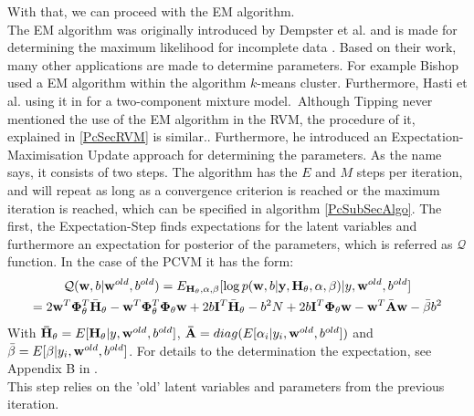 With that, we can proceed with the \acs{EM} algorithm.\cite{Chen.2009}\\
The \acs{EM} algorithm was originally introduced by Dempster et al. and is made for determining the maximum likelihood for incomplete data \cite{Dempster.1977}. 
Based on their work, many other applications are made to determine parameters.
For example Bishop used a \acs{EM} algorithm within the algorithm $k$-means cluster.\cite[p. 426-428]{Bishop.2009}
Furthermore, Hasti et al. using it in \cite[p. 272-276]{TrevorHastie.2009} for a two-component mixture model.\
Although Tipping never mentioned the use of the \acs{EM} algorithm in the \acs{RVM}, the procedure of it, explained in \ref{PcSecRVM} is similar.\cite[p. 233-234]{Tipping.2001}.
Furthermore, he introduced an Expectation-Maximisation Update approach for determining the parameters.\cite[. 235]{Tipping.2001} \newline
As the name says, it consists of two steps.
The algorithm has the $E$ and $M$ steps per iteration, and will repeat as long as a convergence criterion is reached or the maximum iteration is reached, which can be specified in algorithm \ref{PcSubSecAlgo}.
The first, the Expectation-Step finds expectations for the latent variables and furthermore an expectation for posterior of the parameters, which is referred as $\mathcal{Q}$ function.
In the case of the \acs{PCVM} it has the form:\cite{Chen.2009}
\begin{equation}\label{EqPcvmEStep}
\begin{gathered}
	\mathcal{Q}(\mathbf{w},b\vert \mathbf{w}^{old},b^{old}) = E_{\mathbf{H}_{\theta},\alpha,\beta}[\log p (\mathbf{w},b \vert \mathbf{y} ,\mathbf{H}_{\theta},\alpha,\beta) | y,\mathbf{w}^{old},b^{old}]\\
	= 2\mathbf{w}^T \mathbf{\Phi}_{\theta}^T \bar{\mathbf{H}}_\theta - \mathbf{w}^T \mathbf{\Phi}_{\theta}^T  \mathbf{\Phi}_{\theta} \mathbf{w} + 2b\mathbf{I}^T \bar{\mathbf{H}}_{\theta} -  b^2N + 2b\mathbf{I}^T \mathbf{\Phi}_\theta \mathbf{w}- \mathbf{w}^T\bar{\mathbf{A}}\mathbf{w} - \bar{\beta}b^2
\end{gathered}
\end{equation}
With $\mathbf{\bar{H}}_\theta =  E[\mathbf{H}_\theta \vert y, \mathbf{w}^{old}, b^{old}]$, $\mathbf{\bar{A}} = diag(E[\alpha_i|y_i,\mathbf{w}^{old},b^{old}])$ and $\bar{\beta}=E[\beta\vert y_i,\mathbf{w}^{old},b^{old}]$.
For details to the determination the expectation, see Appendix B in \cite{Chen.2009}.\\
This step relies on the 'old' latent variables and parameters from the previous iteration.
